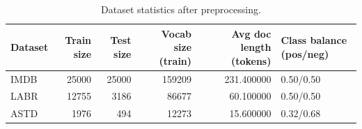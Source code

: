 \begin{table}
\caption{Dataset statistics after preprocessing.}
\label{tab:dataset_stats}
\begin{tabular}{lrrrrl}
\toprule
Dataset & Train size & Test size & Vocab size (train) & Avg doc length (tokens) & Class balance (pos/neg) \\
\midrule
IMDB & 25000 & 25000 & 159209 & 231.400000 & 0.50/0.50 \\
LABR & 12755 & 3186 & 86677 & 60.100000 & 0.50/0.50 \\
ASTD & 1976 & 494 & 12273 & 15.600000 & 0.32/0.68 \\
\bottomrule
\end{tabular}
\end{table}
